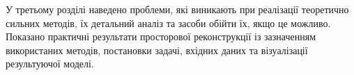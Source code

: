 У третьому розділі наведено проблеми,
які виникають при реалізації теоретично сильних методів,
їх детальний аналіз та засоби обійти їх, якщо це можливо.
Показано практичні результати просторової реконструкції
із зазначенням використаних методів, постановки задачі,
вхідних даних та візуалізації результуючої моделі.

